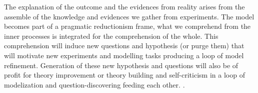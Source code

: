 \documentclass[11pt,oneside,a4paper,openright]{report}
\begin{document}
%
%
%
The explanation of the outcome and the evidences from reality arises from the assemble of the knowledge and evidences we gather from experiments. The model becomes part of a pragmatic reductionism frame, what we comprehend from the inner processes is integrated for the comprehension of the whole. This comprehension will induce new questions and hypothesis (or purge them) that will motivate new experiments and modelling tasks producing a loop of model refinement. Generation of these new hypothesis and questions will also be of profit for theory improvement or theory building and self-criticism in a loop of modelization and question-discovering feeding each other. .\\ 





\end{document}
